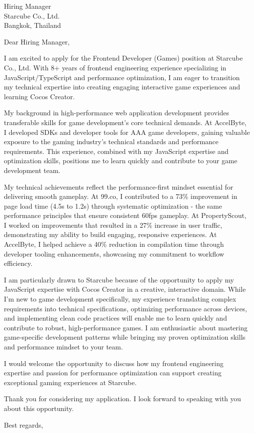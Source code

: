 \documentclass[11pt]{letter}
\begin{document}
\begin{letter}{
  Hiring Manager \\
  Starcube Co., Ltd. \\
  Bangkok, Thailand
}

\opening{Dear Hiring Manager,}
I am excited to apply for the Frontend Developer (Games) position at Starcube Co., Ltd. With 8+ years of frontend engineering experience specializing in JavaScript/TypeScript and performance optimization, I am eager to transition my technical expertise into creating engaging interactive game experiences and learning Cocos Creator.

My background in high-performance web application development provides transferable skills for game development's core technical demands. At AccelByte, I developed SDKs and developer tools for AAA game developers, gaining valuable exposure to the gaming industry's technical standards and performance requirements. This experience, combined with my JavaScript expertise and optimization skills, positions me to learn quickly and contribute to your game development team.

My technical achievements reflect the performance-first mindset essential for delivering smooth gameplay. At 99.co, I contributed to a 73\% improvement in page load time (4.5s to 1.2s) through systematic optimization - the same performance principles that ensure consistent 60fps gameplay. At PropertyScout, I worked on improvements that resulted in a 27\% increase in user traffic, demonstrating my ability to build engaging, responsive experiences. At AccelByte, I helped achieve a 40\% reduction in compilation time through developer tooling enhancements, showcasing my commitment to workflow efficiency.

I am particularly drawn to Starcube because of the opportunity to apply my JavaScript expertise with Cocos Creator in a creative, interactive domain. While I'm new to game development specifically, my experience translating complex requirements into technical specifications, optimizing performance across devices, and implementing clean code practices will enable me to learn quickly and contribute to robust, high-performance games. I am enthusiastic about mastering game-specific development patterns while bringing my proven optimization skills and performance mindset to your team.

I would welcome the opportunity to discuss how my frontend engineering expertise and passion for performance optimization can support creating exceptional gaming experiences at Starcube.

Thank you for considering my application. I look forward to speaking with you about this opportunity.

\closing{Best regards,}

\end{letter}
\end{document}
